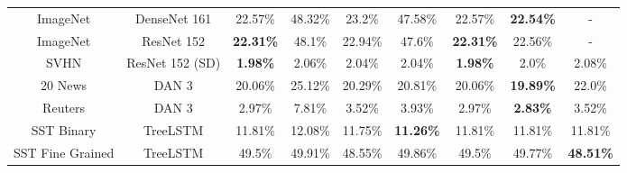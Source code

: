 {\begin{tabular}{c c c c c c c c c}
         ImageNet &     DenseNet 161 &       22.57\% &        48.32\% &    23.2\% &   47.58\% &        22.57\% &       {\bf22.54\%} &              - \\
         ImageNet &       ResNet 152 &     {\bf22.31\%} &         48.1\% &   22.94\% &    47.6\% &      {\bf22.31\%} &         22.56\% &              - \\
             SVHN &  ResNet 152 (SD) &      {\bf1.98\%} &         2.06\% &    2.04\% &    2.04\% &       {\bf1.98\%} &           2.0\% &          2.08\% \\
              \midrule
          20 News &            DAN 3 &       20.06\% &        25.12\% &   20.29\% &   20.81\% &        20.06\% &       {\bf19.89\%} &          22.0\% \\
          Reuters &            DAN 3 &        2.97\% &         7.81\% &    3.52\% &    3.93\% &         2.97\% &        {\bf2.83\%} &          3.52\% \\
       SST Binary &         TreeLSTM &       11.81\% &        12.08\% &   11.75\% &   {\bf11.26\%} &        11.81\% &          11.81\% &       11.81\% \\
 SST Fine Grained &         TreeLSTM &        49.5\% &        49.91\% &   48.55\% &   49.86\% &         49.5\% &         49.77\% &       {\bf48.51\%} \\
\bottomrule
\end{tabular}
}
